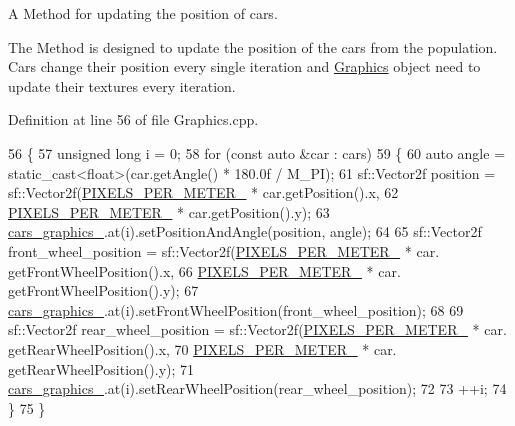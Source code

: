 A Method for updating the position of cars. 

The Method is designed to update the position of the cars from the population. Cars change their position every single iteration and \hyperlink{classGraphics}{Graphics} object need to update their textures every iteration. 

Definition at line 56 of file Graphics.\+cpp.


\begin{DoxyCode}
56                                                           \{
57     \textcolor{keywordtype}{unsigned} \textcolor{keywordtype}{long} i = 0;
58     \textcolor{keywordflow}{for} (\textcolor{keyword}{const} \textcolor{keyword}{auto} &car : cars)
59     \{
60         \textcolor{keyword}{auto} angle = \textcolor{keyword}{static\_cast<}\textcolor{keywordtype}{float}\textcolor{keyword}{>}(car.getAngle() * 180.0f / M\_PI);
61         sf::Vector2f position = sf::Vector2f(\hyperlink{classGraphics_af9c6251065c2900d0a92380c2bea26b2}{PIXELS\_PER\_METER\_} * car.getPosition().x,
62                                              \hyperlink{classGraphics_af9c6251065c2900d0a92380c2bea26b2}{PIXELS\_PER\_METER\_} * car.getPosition().y);
63         \hyperlink{classGraphics_a8be356ffe3ee47f915027361b6ae34ab}{cars\_graphics\_}.at(i).setPositionAndAngle(position, angle);
64 
65         sf::Vector2f front\_wheel\_position = sf::Vector2f(\hyperlink{classGraphics_af9c6251065c2900d0a92380c2bea26b2}{PIXELS\_PER\_METER\_} * car.
      getFrontWheelPosition().x,
66                                                          \hyperlink{classGraphics_af9c6251065c2900d0a92380c2bea26b2}{PIXELS\_PER\_METER\_} * car.
      getFrontWheelPosition().y);
67         \hyperlink{classGraphics_a8be356ffe3ee47f915027361b6ae34ab}{cars\_graphics\_}.at(i).setFrontWheelPosition(front\_wheel\_position);
68 
69         sf::Vector2f rear\_wheel\_position = sf::Vector2f(\hyperlink{classGraphics_af9c6251065c2900d0a92380c2bea26b2}{PIXELS\_PER\_METER\_} * car.
      getRearWheelPosition().x,
70                                                         \hyperlink{classGraphics_af9c6251065c2900d0a92380c2bea26b2}{PIXELS\_PER\_METER\_} * car.
      getRearWheelPosition().y);
71         \hyperlink{classGraphics_a8be356ffe3ee47f915027361b6ae34ab}{cars\_graphics\_}.at(i).setRearWheelPosition(rear\_wheel\_position);
72 
73         ++i;
74     \}
75 \}
\end{DoxyCode}
\mbox{\label{classGraphics_adf0937a71f5d477bcd9c553fe863e87b}} 
